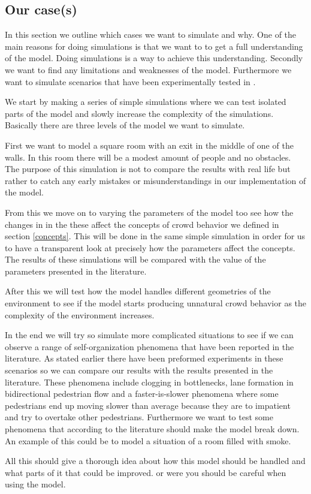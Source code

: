 \subsection{Our case(s)}
In this section we outline which cases we want to simulate and why.
One of the main reasons for doing simulations is that we want to to get 
a full understanding of the model. Doing simulations is a way to achieve this
understanding. Secondly we want to find any limitations and weaknesses of the 
model. Furthermore we want to simulate scenarios that have been experimentally 
tested in \citep{self-org}.

We start by making a series of simple simulations  where we can test isolated parts 
of the model and slowly increase the complexity of the simulations. Basically there 
are three levels of the model we want to simulate. 

First we want to model a square room with an exit in the middle of one of the walls. 
In this room there will be a modest amount of people and no obstacles. The purpose of 
this simulation is not to compare the results with real life but rather to catch any 
early mistakes or misunderstandings in our implementation of the model.

From this we move on to varying the parameters of the model too see how the changes in 
in the these affect the concepts of crowd behavior we defined in section \ref{concepts}. 
This will be done in the same simple simulation in order for us to have a transparent look 
at precisely how the parameters affect the concepts. The results of these simulations 
will be compared with the value of the parameters presented in the literature.

After this we will test how the model handles different geometries of the environment 
to see if the model starts producing unnatural crowd behavior as the complexity of the 
environment increases. 

In the end we will try so simulate more complicated situations to see if we can observe 
a range of self-organization phenomena that have been reported in the literature. As 
stated earlier there have been preformed experiments in these scenarios so we can 
compare our results with the results presented in the literature. These phenomena 
include clogging in bottlenecks, lane formation in bidirectional pedestrian 
flow and a faster-is-slower phenomena where some pedestrians end up moving slower than 
average because they are to impatient and try to overtake other pedestrians\cite{self-org}. 
Furthermore we want to test some phenomena  that according to the literature should make 
the model break down. An example of this could be to model a situation of a room filled 
with smoke.   

All this should give a thorough idea about how this model should be handled and what parts 
of it that could be improved. or were you should be careful when using the model.


